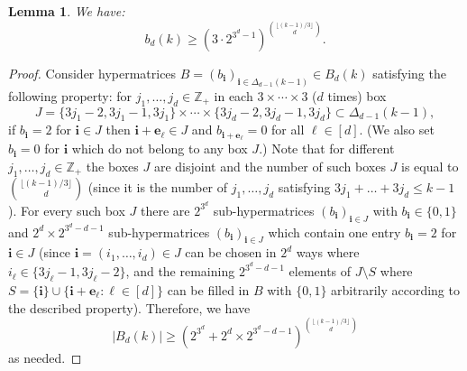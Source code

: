 \documentclass[12pt]{amsart}
\newtheorem{lemma}[theorem]{Lemma}
\theoremstyle{definition}
\theoremstyle{remark}
\begin{document}
\begin{lemma}\label{lemlb}
We have: 
$$
b_d(k) \ge \left(3 \cdot 2^{3^d - 1} \right)^{\binom{\lfloor (k-1)/3 \rfloor}{d}}. 
$$
\end{lemma}

\begin{proof}
Consider 
hypermatrices $B = (b_{\mathbf{i}})_{\mathbf{i} \in \Delta_{d-1}(k-1)} \in B_d(k)$ %
satisfying the following property: 
for $j_1,\ldots, j_d \in \mathbb{Z}_+$ in each $3 \times \cdots \times 3$ ($d$ times) box 
$$J = \{3j_1-2, 3 j_1 - 1, 3j_1 \} \times \cdots \times \{3j_d-2, 3j_d - 1, 3j_d \} \subset \Delta_{d-1}(k-1),$$ %
if $b_{\mathbf{i}} = 2$ for $\mathbf{i} \in J$ %
then $\mathbf{i} + \mathbf{e}_{\ell} \in J$  and $b_{\mathbf{i} + \mathbf{e}_{\ell}} =0$ for all $\ell \in [d]$. %
(We also set $b_{\mathbf{i}} = 0$ for $\mathbf{i}$ which do not belong to any box $J$.)
Note that for different $j_1,\ldots, j_d \in \mathbb{Z}_+$ the boxes $J$ are disjoint and the number of such boxes $J$ is equal to $\binom{\lfloor (k-1)/3 \rfloor}{d}$ (since it is the number of $j_1,\ldots, j_d$ satisfying $3j_1 + \ldots + 3j_d \le k - 1$). For every such box $J$ there are $2^{3^d}$ sub-hypermatrices $(b_{\mathbf{i}})_{\mathbf{i} \in J}$ with $b_{\mathbf{i}} \in \{0, 1\}$ and $2^{d} \times 2^{3^d - d - 1}$ sub-hypermatrices $(b_{\mathbf{i}})_{\mathbf{i} \in J}$ which contain one entry $b_{\mathbf{i}} = 2$ for $\mathbf{i} \in J$ (since  $\mathbf{i} = (i_1,\ldots, i_d) \in J$ can be chosen in $2^d$ ways where $i_{\ell} \in \{3j_{\ell} - 1, 3 j_{\ell} - 2 \}$, %
and the remaining $2^{3^d - d - 1}$ elements of $J \setminus S$ where $S = \{\mathbf{i} \} \cup \{\mathbf{i} + \mathbf{e}_{\ell}  : \ell \in [d]\}$ %
can be filled in $B$ with  $\{0,1 \}$ arbitrarily according to the described property). Therefore, we have 
$$|B_d(k)| \ge \left(2^{3^d} + 2^{d} \times 2^{3^d - d - 1} \right)^{\binom{\lfloor (k-1)/3 \rfloor}{d}}$$
as needed.
\end{proof}
\end{document}
